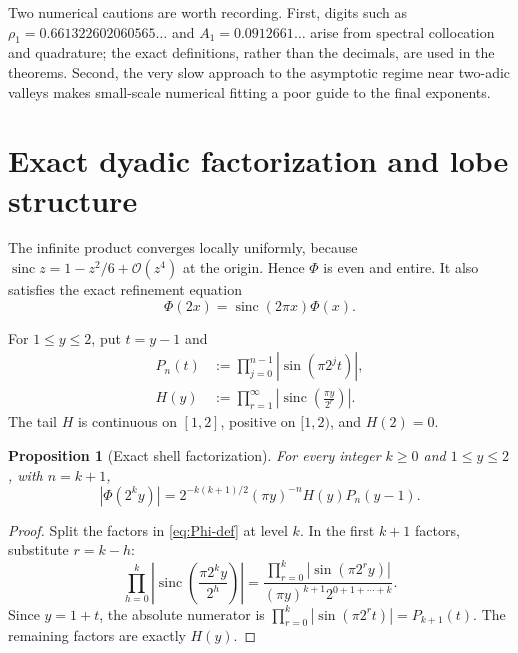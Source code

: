 \documentclass[11pt]{article}
\newtheorem{proposition}[theorem]{Proposition}
\theoremstyle{definition}
\theoremstyle{remark}
\newcommand{\sinc}{\operatorname{sinc}}
\newcommand{\bigO}{\mathcal O}
\begin{document}
Two numerical cautions are worth recording.  First, digits such as
\(\rho_1=0.661322602060565\ldots\) and \(A_1=0.0912661\ldots\) arise from
spectral collocation and quadrature; the exact definitions, rather than the
decimals, are used in the theorems.  Second, the very slow approach to the
asymptotic regime near two-adic valleys makes small-scale numerical fitting a
poor guide to the final exponents.

\section{Exact dyadic factorization and lobe structure}
\label{sec:factorization}

The infinite product converges locally uniformly, because
\(\sinc z=1-z^2/6+\bigO(z^4)\) at the origin.  Hence \(\Phi\) is even and
entire.  It also satisfies the exact refinement equation\cite{arias1982,wikipedia}
\begin{equation}
 \Phi(2x)=\sinc(2\pi x)\Phi(x).
 \label{eq:refinement}
\end{equation}

For \(1\le y\le2\), put \(t=y-1\) and
\begin{align}
 P_n(t)&:=\prod_{j=0}^{n-1}|\sin(\pi2^jt)|, \label{eq:Pn}\\
 H(y)&:=\prod_{r=1}^{\infty}
 \left|\sinc\!\left(\frac{\pi y}{2^r}\right)\right|.
 \label{eq:H}
\end{align}
The tail \(H\) is continuous on \([1,2]\), positive on \([1,2)\), and
\(H(2)=0\).

\begin{proposition}[Exact shell factorization]
\label{prop:factorization}
For every integer \(k\ge0\) and \(1\le y\le2\), with \(n=k+1\),
\begin{equation}
 |\Phi(2^ky)|
 =2^{-k(k+1)/2}(\pi y)^{-n}H(y)P_n(y-1).
 \label{eq:factorization}
\end{equation}
\end{proposition}

\begin{proof}
Split the factors in \eqref{eq:Phi-def} at level \(k\).  In the first
\(k+1\) factors, substitute \(r=k-h\):
\[
 \prod_{h=0}^{k}
 \left|\sinc\!\left(\frac{\pi2^ky}{2^h}\right)\right|
 =\frac{\prod_{r=0}^{k}|\sin(\pi2^ry)|}
 {(\pi y)^{k+1}2^{0+1+\cdots+k}}.
\]
Since \(y=1+t\), the absolute numerator is
\(\prod_{r=0}^k|\sin(\pi2^rt)|=P_{k+1}(t)\).  The remaining factors are
exactly \(H(y)\).
\end{proof}
\end{document}
